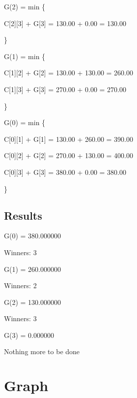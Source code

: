 \documentclass{article}
\begin{document}
G(2) = min \{ 

\hspace{1cm} C[2][3] + G[3] = 130.00 + 0.00 = 130.00 

 \} 


G(1) = min \{ 

\hspace{1cm} C[1][2] + G[2] = 130.00 + 130.00 = 260.00 

\hspace{1cm} C[1][3] + G[3] = 270.00 + 0.00 = 270.00 

 \} 


G(0) = min \{ 

\hspace{1cm} C[0][1] + G[1] = 130.00 + 260.00 = 390.00 

\hspace{1cm} C[0][2] + G[2] = 270.00 + 130.00 = 400.00 

\hspace{1cm} C[0][3] + G[3] = 380.00 + 0.00 = 380.00 

 \} 


\subsection{Results}

\noindent G(0) = 380.000000 

\noindent Winners: 3 

\noindent G(1) = 260.000000 

\noindent Winners: 2 

\noindent G(2) = 130.000000 

\noindent Winners: 3 

\noindent G(3) = 0.000000 

\noindent Nothing more to be done
\section{Graph}
\begin{center}
\begin{adjustbox}{max width=\textwidth}
\end{adjustbox}


\end{center}
\end{document}
